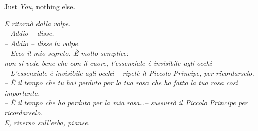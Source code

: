 \vfill

\noindent Just \emph{You}, nothing else.

\vfill


\iffalse
Put your acknowledgments here.

Many thanks to everybody who already sent me a postcard!

Regarding the typography and other help, many thanks go to Marco 
Kuhlmann, Philipp Lehman, Lothar Schlesier, Jim Young, Lorenzo 
Pantieri and Enrico Gregorio\footnote{Members of GuIT (Gruppo 
Italiano Utilizzatori di \TeX\ e \LaTeX )}, J\"org Sommer, 
Joachim K\"ostler, Daniel Gottschlag, Denis Aydin, Paride 
Legovini, Steffen Prochnow, Nicolas Repp, Hinrich Harms, 
 Roland Winkler, J\"org Weber, 
 and the whole \LaTeX-community for support, ideas and 
 some great software.

\bigskip

\noindent\emph{Regarding \mLyX}: The \mLyX\ port was intially done by 
\emph{Nicholas Mariette} in March 2009 and continued by 
\emph{Ivo Pletikosi\'c} in 2011. Thank you very much for your 
work and the contributions to the original style.
\fi

\endgroup

\vfill

\begin{flushright}{\slshape    
    \vskip-3cm 
    \rightskip-3cm
    E ritorn\`o dalla volpe.\\
    -- Addio -- disse.\\
    -- Addio -- disse la volpe.\\
    -- Ecco il mio segreto. \`E molto semplice:\\
        \flqq non si vede bene che con il cuore,
        l'essenziale \`e invisibile agli occhi\frqq\\
    -- L'essenziale \`e invisibile agli occhi -- ripet\`e il Piccolo Principe, per ricordarselo.\\
    -- \`E il tempo che tu hai perduto per la tua rosa che ha fatto la tua rosa cos\`i importante.\\
    -- \`E il tempo che ho perduto per la mia rosa\ldots -- sussurr\`o il Piccolo Principe per ricordarselo.\\
    E, riverso sull'erba, pianse.\\
    \quad
    } 
\end{flushright}

